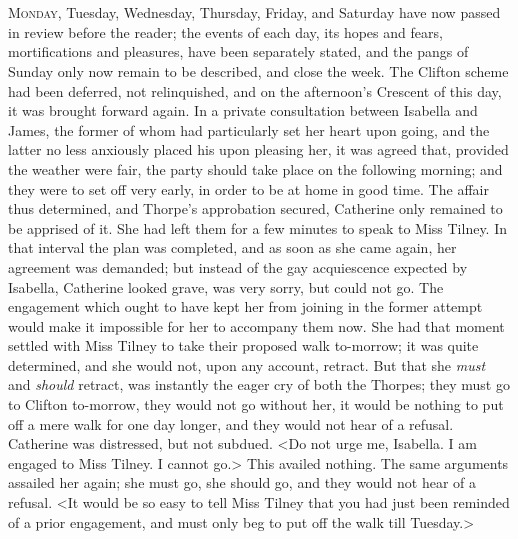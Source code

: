 \chapter[Chapter \thechapter]{} 

 \lettrine{M}{onday}, Tuesday, Wednesday, Thursday, Friday, and Saturday have now passed in review before the reader; the events of each day, its hopes and fears, mortifications and pleasures, have been separately stated, and the pangs of Sunday only now remain to be described, and close the week. The Clifton scheme had been deferred, not relinquished, and on the afternoon's Crescent of this day, it was brought forward again. In a private consultation between Isabella and James, the former of whom had particularly set her heart upon going, and the latter no less anxiously placed his upon pleasing her, it was agreed that, provided the weather were fair, the party should take place on the following morning; and they were to set off very early, in order to be at home in good time. The affair thus determined, and Thorpe's approbation secured, Catherine only remained to be apprised of it. She had left them for a few minutes to speak to Miss Tilney. In that interval the plan was completed, and as soon as she came again, her agreement was demanded; but instead of the gay acquiescence expected by Isabella, Catherine looked grave, was very sorry, but could not go. The engagement which ought to have kept her from joining in the former attempt would make it impossible for her to accompany them now. She had that moment settled with Miss Tilney to take their proposed walk to-morrow; it was quite determined, and she would not, upon any account, retract. But that she \textit{must} and \textit{should} retract, was instantly the eager cry of both the Thorpes; they must go to Clifton to-morrow, they would not go without her, it would be nothing to put off a mere walk for one day longer, and they would not hear of a refusal. Catherine was distressed, but not subdued. <Do not urge me, Isabella. I am engaged to Miss Tilney. I cannot go.> This availed nothing. The same arguments assailed her again; she must go, she should go, and they would not hear of a refusal. <It would be so easy to tell Miss Tilney that you had just been reminded of a prior engagement, and must only beg to put off the walk till Tuesday.> 
 
